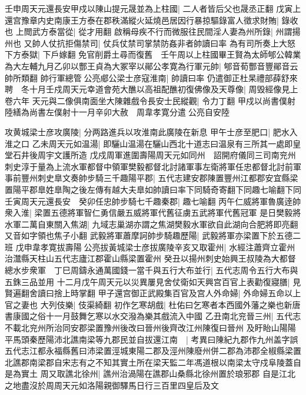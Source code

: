 壬申周天元還長安甲戍以陳山提元晟並為上柱國|{
	二人者皆后父也晟丞正翻}
戊寅上還宫豫章内史南康王方泰在郡秩滿縱火延燒邑居因行暴掠驅錄富人徵求財賄|{
	錄收也}
上閲武方泰當從|{
	從才用翻}
啟稱母疾不行而微服往民間淫人妻為州所錄|{
	州謂揚州也}
又帥人仗抗拒傷禁司|{
	仗兵仗禁司掌禁防姦非者帥讀曰率}
為有司所奏上大怒下方泰獄|{
	下戶嫁翻}
免官削爵土尋而復舊　壬午周以上柱國畢王賢為太師郇公韓業為大左輔九月乙卯以酆王貞為大冢宰以鄖公孝寛為行軍元帥|{
	郇音荀酆音豐鄖音云帥所類翻}
帥行軍總管公亮郕公梁士彦寇淮南|{
	帥讀曰率}
仍遣御正杜杲禮部薛舒來聘　冬十月壬戍周天元幸道會苑大醮以高祖配醮初復佛像及天尊像|{
	周毁經像見上卷六年}
天元與二像俱南面坐大陳雜戲令長安士民縱觀|{
	令力丁翻}
甲戍以尚書僕射陸繕為尚書左僕射十一月辛卯大赦　周韋孝寛分遣公亮自安陸

攻黄城梁士彦攻廣陵|{
	分两路進兵以攻淮南此廣陵在新息}
甲午士彦至肥口|{
	肥水入淮之口}
乙未周天元如温湯|{
	即驪山温湯在驪山西北十道志曰温泉有三所其一處即皇堂石井後周宇文護所造}
戊戍周軍進圍壽陽周天元如同州　詔開府儀同三司南兖州刺史淳于量為上流水軍都督中領軍樊毅都督北討諸軍事左衛將軍任忠都督北討前軍事前豐州刺史臯文奏帥步騎三千趣陽平郡|{
	五代志建安郡陳置豐州江都郡安宜縣梁置陽平郡臯姓臯陶之後左傳有越大夫臯如帥讀曰率下同騎奇寄翻下同趣七喻翻下同}
壬寅周天元還長安　癸卯任忠帥步騎七千趣秦郡|{
	趣七喻翻}
丙午仁威將軍魯廣逹帥衆入淮|{
	梁置五德將軍智仁勇信嚴五威將軍代舊征虜五武將軍代舊冠軍}
是日樊毅將水軍二萬自東關入焦湖|{
	九域志巢湖亦謂之焦湖樊毅水軍欲自此湖向合肥將即亮翻又音如字領也焦子小翻}
武毅將軍蕭摩訶帥步騎趣歷陽|{
	武毅將軍亦梁置下於五德二班}
戊申韋孝寛拔壽陽公亮拔黃城梁士彦拔廣陵辛亥又取霍州|{
	水經注蕭齊立霍州治灊縣天柱山五代志廬江郡霍山縣梁置霍州}
癸丑以揚州刺史始興王叔陵為大都督總水步衆軍　丁巳周鑄永通萬國錢一當千與五行大布並行|{
	五代志周令五行大布與五銖三品並用}
十二月戊午周天元以災異屢見舍仗衛如天興宫百官上表勸復寢膳|{
	見賢遍翻舍讀曰捨上時掌翻}
甲子還宫御正武殿集百官及宫人外命婦|{
	外命婦五命以上官之妻也}
大列伎樂|{
	伎渠綺翻}
初作乞寒胡戲|{
	杜佑曰乞寒者本西國外藩之樂也新唐書康國之俗十一月鼓舞乞寒以水交潑為樂其戲流入中國}
乙丑南北兖晉三州|{
	五代志不載北兖州所治同安郡梁置豫州後改曰晉州後齊改江州陳復曰晉州}
及盱眙山陽陽平馬頭秦歷陽沛北譙南梁等九郡民並自拔還江南　|{
	考異曰陳紀九郡作九州盖字誤五代志江都永福縣舊曰沛梁置涇城東陽二郡及涇州陳廢州併二郡為沛郡全椒縣梁置北譙郡南梁郡自宋志有之不知其實土所在梁天監二年馮道根以南梁太守戍阜陵蓋自是為實土}
周又取譙北徐州|{
	譙州治渦陽在譙郡山桑縣北徐州置於琅邪郡}
自是江北之地盡沒於周周天元如洛陽親御驛馬日行三百里四皇后及文

